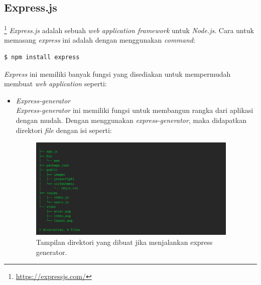 \subsection{Express.js}\footnote{\url{https://expressjs.com/}}
\label{express.js}
\textit{Express.js} adalah sebuah \textit{web application framework} untuk \textit{Node.js}. Cara untuk memasang \textit{express} ini adalah dengan menggunakan \textit{command}:

\begin{lstlisting}
$ npm install express 
\end{lstlisting}

\textit{Express} ini memiliki banyak fungsi yang disediakan untuk mempermudah membuat \textit{web application} seperti: 
\begin{itemize}
    \item {\textit{Express-generator}}\\
    \textit{Express-generator} ini memiliki fungsi untuk membangun rangka dari aplikasi dengan mudah. Dengan menggunakan \textit{express-generator}, maka didapatkan direktori \textit{file} dengan isi seperti: \\
    \begin{figure}[h]
      \includegraphics[width=10cm]{./Gambar/express_generator.png}
      \centering
      \caption{Tampilan direktori yang dibuat jika menjalankan express generator.}
      \label{fig:express_generator}
    \end{figure}
    

\end{itemize}
